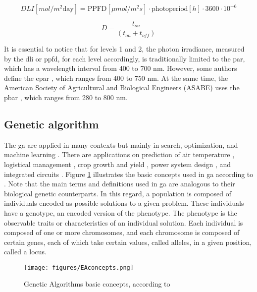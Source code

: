 \documentclass[preprint, review, 12pt]{elsarticle}
\begin{document}
\begin{equation}
DLI [mol/m^2\text{day}] = \text{PPFD} [\mu mol/m^2s] \cdot \text{photoperiod} [h] \cdot 3600 \cdot 10^{-6}
\label{eq:DLI}
\end{equation}

\begin{equation}
     D = \frac{t_{on}}{(t_{on} + t_{off})}
     \label{eq:dutycycle}
\end{equation}

It is essential to notice that for levels 1 and 2, the photon irradiance, measured by the \gls{dli} or \gls{ppfd}, for each level accordingly, is traditionally limited to the \gls{par}, which has a wavelength interval from 400 to 700 nm. However, some authors define the \gls{epar} \cite{pessarakli2017, zhen2021, zhen2020}, which ranges from 400 to 750 nm. At the same time, the American Society of Agricultural and Biological Engineers (ASABE) uses the \gls{pbar} \cite{zotero-338}, which ranges from 280 to 800 nm.  

\subsection{Genetic algorithm}

The \gls{ga} are applied in many contexts but mainly in search, optimization, and machine learning \cite{goldberg1989, haupt2004, sivanandam2008, valdez2011, kao2008}. There are applications on prediction of air temperature \cite{venkadesh2013}, logistical management \cite{asgari2013}, crop growth and yield \cite{dai2009, jain2021}, power system design \cite{panda2008}, and integrated circuits \cite{delimamoreto2017, moreto2019}. Figure \ref{fig:eaConcepts} illustrates the basic concepts used in \gls{ga} according to \cite{coello2007}. Note that the main terms and definitions used in \gls{ga} are analogous to their biological genetic counterparts. In this regard, a population is composed of individuals encoded as possible solutions to a given problem. These individuals have a genotype, an encoded version of the phenotype. The phenotype is the observable traits or characteristics of an individual solution. Each individual is composed of one or more chromosomes, and each chromosome is composed of certain genes, each of which take certain values, called alleles, in a given position, called a locus.  

\begin{figure}
    \centering
    \texttt{[image: figures/EAconcepts.png]}
    \caption{Genetic Algorithms basic concepts, according to \cite{coello2007}}
    \label{fig:eaConcepts}
\end{figure}
\end{document}
